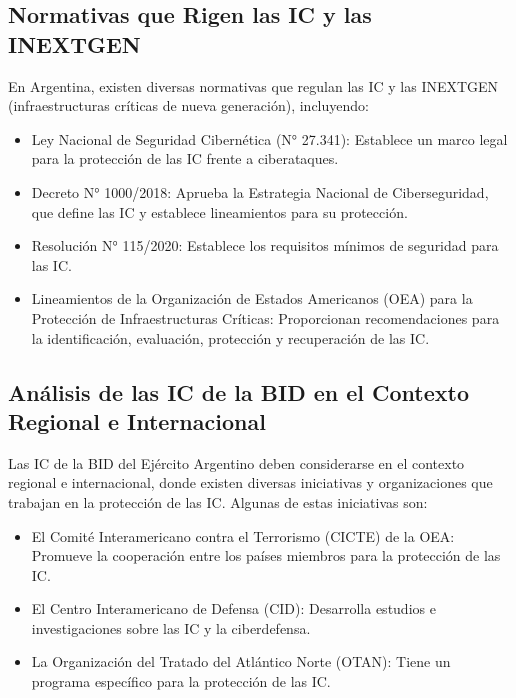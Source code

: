 \documentclass{article}
\providecommand{\tightlist}{%
  \setlength{\itemsep}{0pt}\setlength{\parskip}{0pt}}
\begin{document}
\hypertarget{normativas-que-rigen-las-ic-y-las-inextgen}{%
\subsection{Normativas que Rigen las IC y las
INEXTGEN}\label{normativas-que-rigen-las-ic-y-las-inextgen}}

En Argentina, existen diversas normativas que regulan las IC y las
INEXTGEN (infraestructuras críticas de nueva generación), incluyendo:

\begin{itemize}
\tightlist
\item
  Ley Nacional de Seguridad Cibernética (N° 27.341): Establece un marco
  legal para la protección de las IC frente a ciberataques.
\item
  Decreto N° 1000/2018: Aprueba la Estrategia Nacional de
  Ciberseguridad, que define las IC y establece lineamientos para su
  protección.
\item
  Resolución N° 115/2020: Establece los requisitos mínimos de seguridad
  para las IC.
\item
  Lineamientos de la Organización de Estados Americanos (OEA) para la
  Protección de Infraestructuras Críticas: Proporcionan recomendaciones
  para la identificación, evaluación, protección y recuperación de las
  IC.
\end{itemize}

\hypertarget{anuxe1lisis-de-las-ic-de-la-bid-en-el-contexto-regional-e-internacional}{%
\subsection{Análisis de las IC de la BID en el Contexto Regional e
Internacional}\label{anuxe1lisis-de-las-ic-de-la-bid-en-el-contexto-regional-e-internacional}}

Las IC de la BID del Ejército Argentino deben considerarse en el
contexto regional e internacional, donde existen diversas iniciativas y
organizaciones que trabajan en la protección de las IC. Algunas de estas
iniciativas son:

\begin{itemize}
\tightlist
\item
  El Comité Interamericano contra el Terrorismo (CICTE) de la OEA:
  Promueve la cooperación entre los países miembros para la protección
  de las IC.
\item
  El Centro Interamericano de Defensa (CID): Desarrolla estudios e
  investigaciones sobre las IC y la ciberdefensa.
\item
  La Organización del Tratado del Atlántico Norte (OTAN): Tiene un
  programa específico para la protección de las IC.
\end{itemize}
\end{document}
